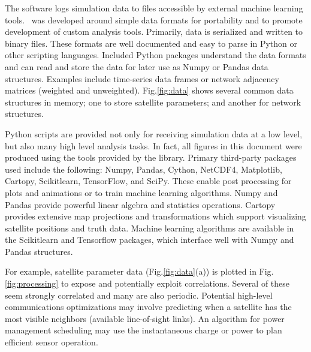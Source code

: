 \documentclass[conference]{IEEEtran}
\newcommand{\project}{{\sc{Collaborate}}~}
\begin{document}
The software logs simulation data to files accessible by external machine learning tools.  \project was developed around simple data formats for portability and to promote development of custom analysis tools.  Primarily, data is serialized and written to binary files.  These formats are well documented and easy to parse in Python or other scripting languages.  Included Python packages understand the data formats and can read and store the data for later use as Numpy or Pandas data structures.  Examples include time-series data frames or network adjacency matrices (weighted and unweighted).  Fig.\ref{fig:data} shows several common data structures in memory; one to store satellite parameters; and another for network structures.

Python scripts are provided not only for receiving simulation data at a low level, but also many high level analysis tasks.  In fact, all figures in this document were produced using the tools provided by the library.  Primary third-party packages used include the following: Numpy, Pandas, Cython, NetCDF4, Matplotlib, Cartopy, Scikitlearn, TensorFlow, and SciPy.  These enable post processing for plots and animations or to train machine learning algorithms.  Numpy and Pandas provide powerful linear algebra and statistics operations.  Cartopy provides extensive map projections and transformations which support visualizing satellite positions and truth data.  Machine learning algorithms are available in the Scikitlearn and Tensorflow packages, which interface well with Numpy and Pandas structures.

For example, satellite parameter data (Fig.\ref{fig:data}(a)) is plotted in Fig.\ref{fig:processing} to expose and potentially exploit correlations.  Several of these seem strongly correlated and many are also periodic.  Potential high-level communications optimizations may involve predicting when a satellite has the most visible neighbors (available line-of-sight links).  An algorithm for power management scheduling may use the instantaneous charge or power to plan efficient sensor operation.
\end{document}
